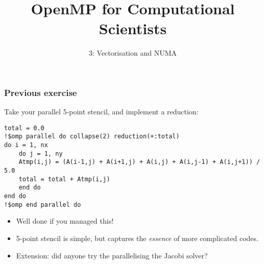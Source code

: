 \documentclass[aspectratio=169]{beamer}
\title{OpenMP for Computational Scientists}
\subtitle{3: Vectorisation and NUMA}
\begin{document}
\frame{\titlepage}

\begin{frame}[fragile]
\frametitle{Previous exercise}

Take your parallel 5-point stencil, and implement a reduction:
\begin{verbatim}
total = 0.0
!$omp parallel do collapse(2) reduction(+:total)
do i = 1, nx
    do j = 1, ny
    Atmp(i,j) = (A(i-1,j) + A(i+1,j) + A(i,j) + A(i,j-1) + A(i,j+1)) / 5.0
    total = total + Atmp(i,j)
    end do
end do
!$omp end parallel do
\end{verbatim}

\begin{itemize}
    \item Well done if you managed this!
    \item 5-point stencil is simple, but captures the \emph{essence} of more complicated codes.
    \item Extension: did anyone try the parallelising the Jacobi solver?
\end{itemize}

\end{frame}

\end{document}
